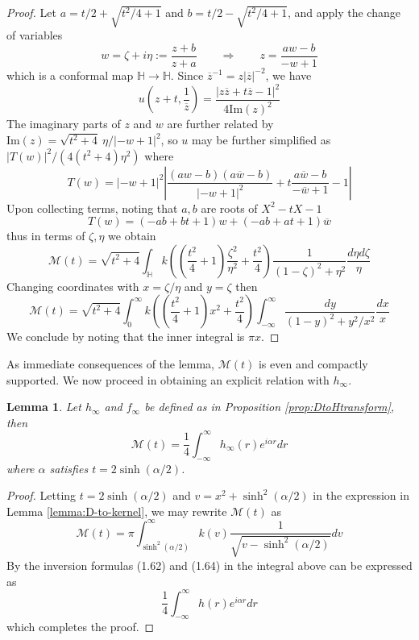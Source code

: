\documentclass{article}
\newtheorem{lemma}[theorem]{Lemma}
\numberwithin{equation}{section}
\begin{document}
\begin{proof}
    Let $a=t/2+\sqrt{t^2/4+1}$ and $b=t/2-\sqrt{t^2/4+1}$, and apply the change of variables $$w=\zeta+i\eta := \frac{z+b}{z+a} \qquad \Longrightarrow \qquad z=\frac{aw-b}{-w+1}$$
    which is a conformal map $\mathbb{H} \to \mathbb{H}$. Since $\overline{z}^{-1}=z|\overline{z}|^{-2}$, we have
    $$u(z+t, \frac{1}{\overline{z}})=\frac{|z\overline{z}+t\overline{z}-1|^2}{4\text{Im}(z)^2}$$
    The imaginary parts of $z$ and $w$ are further related by $\text{Im}(z)=\sqrt{t^2+4}\ \eta/|-w+1|^2$, so $u$ may be further simplified as $|T(w)|^2/(4(t^2+4)\eta^2)$ where
    \begin{equation}
    T(w)=|-w+1|^2\left|\frac{(aw-b)(a\overline{w}-b)}{|-w+1|^2}+t\frac{a\overline{w}-b}{-\overline{w}+1}-1\right|
    \end{equation}
    Upon collecting terms, noting that $a,b$ are roots of $X^2-tX-1$
    $$T(w)=(-ab+bt+1)w+(-ab+at+1)\overline{w}$$ thus in terms of $\zeta,\eta$ we obtain
    \begin{equation}
    \mathcal{M}(t)=\sqrt{t^2+4}\int_{\mathbb{H}}k\left((\frac{t^2}{4}+1)\frac{\zeta^2}{\eta^2}+\frac{t^2}{4}\right)\frac{1}{(1-\zeta)^2+\eta^2}\frac{d\eta d\zeta}{\eta}
    \end{equation}
    Changing coordinates with $x=\zeta/\eta$ and $y=\zeta$ then
    $$\mathcal{M}(t)=\sqrt{t^2+4}\int_{0}^{\infty}k\left((\frac{t^2}{4}+1)x^2+\frac{t^2}{4}\right)\int_{-\infty}^{\infty}\frac{dy}{(1-y)^2+y^2/x^2}\frac{dx}{x}$$
    We conclude by noting that the inner integral is $\pi x$.
\end{proof}

As immediate consequences of the lemma, $\mathcal{M}(t)$ is even and compactly supported. We now proceed in obtaining an explicit relation with $h_\infty$.

\begin{lemma}
    Let $h_\infty$ and $f_\infty$ be defined as in Proposition \ref{prop:DtoHtransform}, then
    \begin{equation}\label{eq:D-to-h-infty}
        \mathcal{M}(t)=\frac{1}{4}\int_{-\infty}^{\infty}h_\infty(r)e^{i\alpha r}dr
    \end{equation}
        where $\alpha$ satisfies $t=2\sinh(\alpha/2)$.
\end{lemma}

\begin{proof}
    Letting $t=2\sinh(\alpha/2)$ and $v=x^2+\sinh^2(\alpha/2)$ in the expression in Lemma \ref{lemma:D-to-kernel}, we may rewrite $\mathcal{M}(t)$ as
    \begin{equation}
        \mathcal{M}(t)=\pi\int_{\sinh^2(\alpha/2)}^{\infty}k(v)\frac{1}{\sqrt{v-\sinh^2(\alpha/2)}}dv
    \end{equation}
        By the inversion formulas (1.62) and (1.64) in \cite{Spectralmethods} the integral above can be expressed as
        $$\frac{1}{4}\int_{-\infty}^{\infty}h(r)e^{i\alpha r}dr$$
        which completes the proof.
\end{proof}
\end{document}
